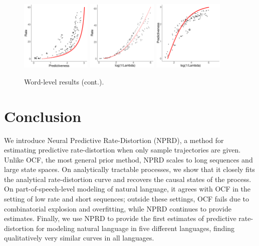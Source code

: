 \documentclass[entropy,article,submit,moreauthors,pdftex,10pt,a4paper]{Definitions/mdpi}
\begin{document}
\begin{figure}
\begin{center}
		\includegraphics[width=0.3\textwidth]{code/figures/LDC2012T05-words-info-fitted.pdf}
\includegraphics[width=0.3\textwidth]{code/figures/LDC2012T05-words-nlogbeta-mem-fitted.pdf}
\includegraphics[width=0.3\textwidth]{code/figures/LDC2012T05-words-nlogbeta-ee-fitted.pdf}
	\end{center}
	\caption{Word-level results (cont.).}\label{fig:wordlevel-fit-2}
\end{figure}






\section{Conclusion}
We introduce Neural Predictive Rate-Distortion (NPRD), a method for estimating predictive rate-distortion when only sample trajectories are given.
Unlike OCF, the most general prior method, NPRD scales to long sequences and large state spaces.
On analytically tractable processes, we show that it closely fits the analytical rate-distortion curve and recovers the causal states of the process.
On part-of-speech-level modeling of natural language, it agrees with OCF in the setting of low rate and short sequences; outside these settings, OCF fails due to combinatorial explosion and overfitting, while NPRD continues to provide estimates.
Finally, we use NPRD to provide the first estimates of predictive rate-distortion for modeling natural language in five different languages, finding qualitatively very similar curves in all languages.
\end{document}
